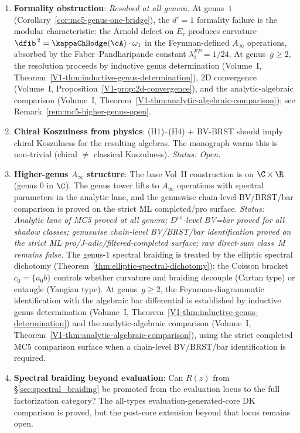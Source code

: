 \begin{enumerate}
\item \textbf{Formality obstruction}: \emph{Resolved at all genera.} At genus~$1$ (Corollary~\ref{cor:mc5-genus-one-bridge}), the $d'=1$ formality failure is the modular characteristic: the Arnold defect on $E_\tau$ produces curvature $\dfib^{\,2} = \kappaChHodge(\cA) \cdot \omega_1$ in the Feynman-defined $A_\infty$ operations, absorbed by the Faber--Pandharipande constant $\lambda_1^{FP} = 1/24$. At genus~$g \geq 2$, the resolution proceeds by inductive genus determination (Volume~I, Theorem~\ref*{V1-thm:inductive-genus-determination}), $2$D convergence (Volume~I, Proposition~\ref*{V1-prop:2d-convergence}), and the analytic-algebraic comparison (Volume~I, Theorem~\ref*{V1-thm:analytic-algebraic-comparison}); see Remark~\ref{rem:mc5-higher-genus-open}.

\item \textbf{Chiral Koszulness from physics}: (H1)--(H4) + BV-BRST should imply chiral Koszulness for the resulting algebras. The monograph warns this is non-trivial (chiral $\neq$ classical Koszulness). \emph{Status: Open.}

\item \textbf{Higher-genus $A_\infty$ structure}: The base Vol~II construction is on $\C \times \R$ (genus 0 in $\C$). The genus tower lifts to $A_\infty$ operations with spectral parameters in the analytic lane, and the genuswise chain-level BV/BRST/bar comparison is proved on the strict ML completed/pro surface. \emph{Status: Analytic lane of MC5 proved at all genera; $D^{\mathrm{co}}$-level BV=bar proved for all shadow classes; genuswise chain-level BV/BRST/bar identification proved on the strict ML pro/$J$-adic/filtered-completed surface; raw direct-sum class~M remains false.} The genus-$1$ spectral braiding is treated by the elliptic spectral dichotomy (Theorem~\ref{thm:elliptic-spectral-dichotomy}): the Coisson bracket $c_0 = \{a{}_0 b\}$ controls whether curvature and braiding decouple (Cartan type) or entangle (Yangian type). At genus~$g \geq 2$, the Feynman-diagrammatic identification with the algebraic bar differential is established by inductive genus determination (Volume~I, Theorem~\ref*{V1-thm:inductive-genus-determination}) and the analytic-algebraic comparison (Volume~I, Theorem~\ref*{V1-thm:analytic-algebraic-comparison}), using the strict completed MC5 comparison surface when a chain-level BV/BRST/bar identification is required.

\item \textbf{Spectral braiding beyond evaluation}: Can $R(z)$ from \S\ref{sec:spectral_braiding} be promoted from the evaluation locus to the full factorization category? The all-types evaluation-generated-core DK comparison is proved, but the post-core extension beyond that locus remains open.


\end{enumerate}
